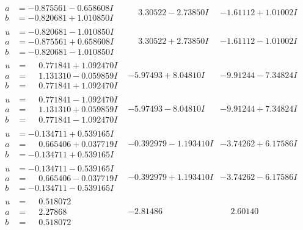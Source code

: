\documentclass[1p]{elsarticle_modified}
\theoremstyle{definition}
\begin{document}
$$\begin{array}{c|c|c}
\begin{aligned}
a &= -0.875561 - 0.658608 I \\
b &= -0.820681 + 1.010850 I\end{aligned}
 & \phantom{-}3.30522 - 2.73850 I & -1.61112 + 1.01002 I \\ \hline\begin{aligned}
u &= -0.820681 - 1.010850 I \\
a &= -0.875561 + 0.658608 I \\
b &= -0.820681 - 1.010850 I\end{aligned}
 & \phantom{-}3.30522 + 2.73850 I & -1.61112 - 1.01002 I \\ \hline\begin{aligned}
u &= \phantom{-}0.771841 + 1.092470 I \\
a &= \phantom{-}1.131310 - 0.059859 I \\
b &= \phantom{-}0.771841 + 1.092470 I\end{aligned}
 & -5.97493 + 8.04810 I & -9.91244 - 7.34824 I \\ \hline\begin{aligned}
u &= \phantom{-}0.771841 - 1.092470 I \\
a &= \phantom{-}1.131310 + 0.059859 I \\
b &= \phantom{-}0.771841 - 1.092470 I\end{aligned}
 & -5.97493 - 8.04810 I & -9.91244 + 7.34824 I \\ \hline\begin{aligned}
u &= -0.134711 + 0.539165 I \\
a &= \phantom{-}0.665406 + 0.037719 I \\
b &= -0.134711 + 0.539165 I\end{aligned}
 & -0.392979 - 1.193410 I & -3.74262 + 6.17586 I \\ \hline\begin{aligned}
u &= -0.134711 - 0.539165 I \\
a &= \phantom{-}0.665406 - 0.037719 I \\
b &= -0.134711 - 0.539165 I\end{aligned}
 & -0.392979 + 1.193410 I & -3.74262 - 6.17586 I \\ \hline\begin{aligned}
u &= \phantom{-}0.518072\phantom{ +0.000000I} \\
a &= \phantom{-}2.27868\phantom{ +0.000000I} \\
b &= \phantom{-}0.518072\phantom{ +0.000000I}\end{aligned}
 & -2.81486\phantom{ +0.000000I} & \phantom{-}2.60140\phantom{ +0.000000I} \\ \hline\begin{aligned}

\end{aligned}
\end{array}$$
\end{document}
